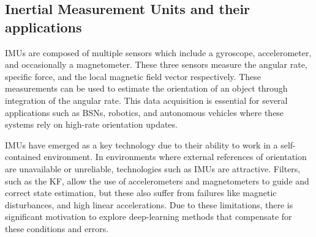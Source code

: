 \subsection{Inertial Measurement Units and their applications}

IMUs are composed of multiple sensors which include a gyroscope, accelerometer, and 
occasionally a magnetometer. These three sensors measure the angular rate, 
specific force, and the local magnetic field vector respectively. These measurements 
can be used to estimate the orientation of an object through integration of the angular rate. 
This data acquisition is essential for several applications such as BSNs\cite{filippeschi_2017_survey}, 
robotics, and autonomous vehicles where these systems rely on high-rate orientation updates.

IMUs have emerged as a key technology due to their ability to work in a self-contained environment. In environments where external references of orientation are unavailable or 
unreliable, technologies such as IMUs are attractive. Filters, such as the KF, 
allow the use of accelerometers and magnetometers to guide and correct state estimation, 
but these also suffer from failures like magnetic disturbances, and high linear accelerations.
Due to these limitations, there is significant motivation to explore deep-learning methods that 
compensate for these conditions and errors.



